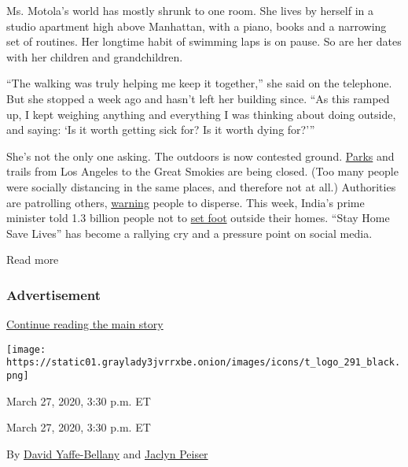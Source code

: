 Ms. Motola's world has mostly shrunk to one room. She lives by herself
in a studio apartment high above Manhattan, with a piano, books and a
narrowing set of routines. Her longtime habit of swimming laps is on
pause. So are her dates with her children and grandchildren.

``The walking was truly helping me keep it together,'' she said on the
telephone. But she stopped a week ago and hasn't left her building
since. ``As this ramped up, I kept weighing anything and everything I
was thinking about doing outside, and saying: `Is it worth getting sick
for? Is it worth dying for?'''

She's not the only one asking. The outdoors is now contested ground.
\href{https://www.latimes.com/travel/story/2020-03-23/where-to-go-outside-in-southern-california-as-options-decrease}{Parks}
and trails from Los Angeles to the Great Smokies are being closed. (Too
many people were socially distancing in the same places, and therefore
not at all.) Authorities are patrolling others,
\href{https://www.seattletimes.com/seattle-news/health/outdoor-crowds-test-the-limits-of-social-distancing-in-fight-against-coronavirus/?utm_source=marketingcloud\&utm_medium=email\&utm_campaign=TSA_032320143559\%20Police\%20turn\%20loudspeakers\%20on\%20crowds\%20at\%20parks.\%20What\%EF\%BF\%BD\%EF\%BF\%BD\%EF\%BF\%BDs\%20next_3_23_2020\&utm_term=Active\%20subscriber\&mod=article_inline}{warning}
people to disperse. This week, India's prime minister told 1.3 billion
people not to
\href{https://www.nytimes3xbfgragh.onion/2020/03/25/world/asia/india-lockdown-coronavirus.html}{set
foot} outside their homes. ``Stay Home Save Lives'' has become a
rallying cry and a pressure point on social media.

Read more

\hypertarget{advertisement-2}{%
\subsubsection{Advertisement}\label{advertisement-2}}

\protect\hyperlink{after-dfp-ad-mid3}{Continue reading the main story}

\texttt{[image: https://static01.graylady3jvrrxbe.onion/images/icons/t\_logo\_291\_black.png]}

March 27, 2020, 3:30 p.m. ET

March 27, 2020, 3:30 p.m. ET

By \href{http://www.nytimes3xbfgragh.onion/by/david-yaffe-bellany}{David
Yaffe-Bellany} and
\href{https://www.nytimes3xbfgragh.onion/by/jaclyn-peiser}{Jaclyn
Peiser}

